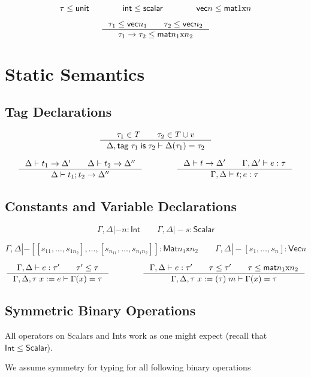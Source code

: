 \documentclass{article}
\begin{document}
\[
\tau\leq\mathsf{unit}
\qquad\qquad
\mathsf{int}\leq\mathsf{scalar}
\qquad\qquad
\mathsf{vec}n\leq\mathsf{mat}1\textnormal{x}n
\]

\[
\inference[]{\tau_1\leq\mathsf{vec}n_1\qquad\tau_2\leq\mathsf{vec}n_2}{\tau_1->\tau_2\leq\mat}
\]

\section{Static Semantics}

\subsection{Tag Declarations}

\[  %
\inference[]{\tau_1\in T\qquad\tau_2\in T\cup v}{\Delta,\mathsf{tag}\;\tau_1\;\mathsf{is}\;\tau_2|-\Delta(\tau_1)=\tau_2}
\]

\[
\inference[]{\Delta|-t_1->\Delta'\qquad \Delta|-t_2->\Delta''}{\Delta|-t_1;t_2->\Delta''}
\qquad\qquad
\inference[]{\Delta|-t->\Delta'\qquad\Gamma,\Delta'|-e:\tau}{\Gamma,\Delta|-t;e:\tau}
\]

\subsection{Constants and Variable Declarations}

\[  %
\Gamma,\Delta|-n:\mathsf{Int}
\qquad
\Gamma,\Delta|-s:\mathsf{Scalar}
\]

\[  %
\Gamma,\Delta|-[[s_{11},\dots,s_{1n_2}],\dots,[s_{n_11},\dots,s_{n_1n_2}]]:\mathsf{Mat}n_1\mathsf{x}n_2
\qquad
\Gamma,\Delta|-[s_1,\dots,s_n]:\mathsf{Vec}n
\]

\[  %
\inference[]{\Gamma,\Delta|-e:\tau'\qquad\tau'\leq\tau}{\Gamma,\Delta,\tau\;x:=e|-\Gamma(x)=\tau}
\qquad\qquad
\inference[]{\Gamma,\Delta|-e:\tau'\qquad\tau\leq\tau'\qquad\tau\leq\mat}
{\Gamma,\Delta,\tau\;x:=(\tau)\;m|-\Gamma(x)=\tau}
\]

\subsection{Symmetric Binary Operations}

All operators on Scalars and Ints work as one might expect (recall that $\mathsf{Int}\leq\mathsf{Scalar}$).

We assume symmetry for typing for all following binary operations
\end{document}
